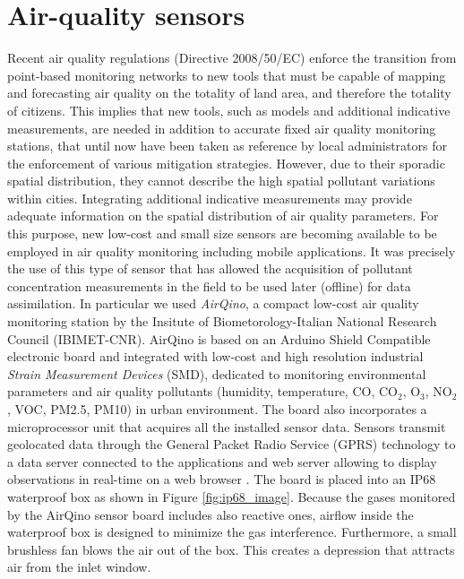 \documentclass[journal]{IEEEtran}
\begin{document}
\section{Air-quality sensors}
Recent air quality regulations (Directive 2008/50/EC) enforce the transition from point-based monitoring networks to new tools that must be capable of mapping and forecasting air quality on the totality of land area, and therefore the totality of citizens. This implies that new tools, such as models and additional indicative measurements, are needed in addition to accurate fixed air quality monitoring stations, that until now have been taken as reference by local administrators for the enforcement of various mitigation strategies. However, due to their sporadic spatial distribution, they cannot describe the high spatial pollutant variations within cities. Integrating additional indicative measurements may provide adequate information on the spatial distribution of air quality parameters. For this purpose, new low-cost and small size sensors are becoming available to be employed in air quality monitoring including mobile applications. 
It was precisely the use of this type of sensor that has allowed the acquisition of pollutant concentration measurements in the field to be used later (offline) for data assimilation. 
In particular we used \textit{AirQino}, a compact low-cost air quality monitoring station by the Insitute of Biometorology-Italian National Research Council (IBIMET-CNR). AirQino  is based on an Arduino Shield Compatible electronic board and integrated with low-cost and high resolution industrial \textit{Strain Measurement Devices} (SMD), dedicated to monitoring environmental parameters and air quality pollutants  (humidity, temperature, CO, CO$_2$, O$_3$, NO$_2$, VOC, PM2.5, PM10) in urban environment. The board also incorporates a microprocessor unit that acquires all the installed sensor data. Sensors transmit geolocated data through the General Packet Radio Service (GPRS) technology to a data server connected to the applications and web server allowing to display observations in real-time on a web browser \cite{bib:alicavphd06}. The board is placed into an IP68 waterproof box as shown in Figure \ref{fig:ip68_image}. Because the gases monitored by the AirQino sensor board includes also reactive ones, airflow inside the waterproof box is designed to minimize the gas interference. Furthermore, a small brushless fan blows the air out of the box. 
This creates a depression that attracts air from the inlet window. 
\end{document}
